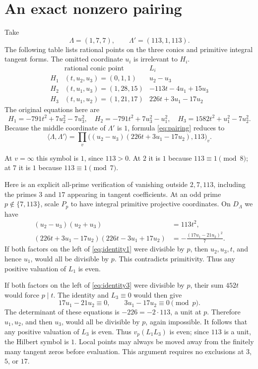 \documentclass[11pt]{article}
\begin{document}
\section{An exact nonzero pairing}
Take
\[
 \Lambda=(1,7,7),\qquad \Lambda'=(113,1,113).
\]
The following table lists rational points on the three conics and primitive integral tangent forms. The omitted coordinate $u_i$ is irrelevant to $H_i$.
\[
\begin{array}{c|c|l}
 &\text{rational conic point}&L_i\\\hline
 H_1&(t,u_2,u_3)=(0,1,1)&u_2-u_3\\
 H_2&(t,u_1,u_3)=(1,28,15)&-113t-4u_1+15u_3\\
 H_3&(t,u_1,u_2)=(1,21,17)&226t+3u_1-17u_2
\end{array}
\]
The original equations here are
\[
 H_1=-791t^2+7u_2^2-7u_3^2,
 \quad H_2=-791t^2+7u_3^2-u_1^2,
 \quad H_3=1582t^2+u_1^2-7u_2^2.
\]
Because the middle coordinate of $\Lambda'$ is $1$, formula \eqref{eq:pairing} reduces to
\begin{equation}\label{eq:two}
 \langle\Lambda,\Lambda'\rangle
 =\prod_v\bigl((u_2-u_3)(226t+3u_1-17u_2),113\bigr)_v.
\end{equation}

At $v=\infty$ this symbol is $1$, since $113>0$. At $2$ it is $1$ because $113\equiv1\pmod8$; at $7$ it is $1$ because $113\equiv1\pmod7$.

Here is an explicit all-prime verification of vanishing outside $2,7,113$, including the primes $3$ and $17$ appearing in tangent coefficients. At an odd prime $p\notin\{7,113\}$, scale $P_p$ to have integral primitive projective coordinates. On $D_\Lambda$ we have
\begin{align}
 (u_2-u_3)(u_2+u_3)&=113t^2,\label{eq:identity1}\\
 (226t+3u_1-17u_2)(226t-3u_1+17u_2)
 &=-\frac{(17u_1-21u_2)^2}{7}.\label{eq:identity3}
\end{align}
If both factors on the left of \eqref{eq:identity1} were divisible by $p$, then $u_2,u_3,t$, and hence $u_1$, would all be divisible by $p$. This contradicts primitivity. Thus any positive valuation of $L_1$ is even.

If both factors on the left of \eqref{eq:identity3} were divisible by $p$, their sum $452t$ would force $p\mid t$. The identity and $L_3\equiv0$ would then give
\[
 17u_1-21u_2\equiv0,\qquad3u_1-17u_2\equiv0\pmod p.
\]
The determinant of these equations is $-226=-2\cdot113$, a unit at $p$. Therefore $u_1,u_2$, and then $u_3$, would all be divisible by $p$, again impossible. It follows that any positive valuation of $L_3$ is even. Thus $v_p(L_1L_3)$ is even; since $113$ is a unit, the Hilbert symbol is $1$. Local points may always be moved away from the finitely many tangent zeros before evaluation. This argument requires no exclusions at $3$, $5$, or $17$.
\end{document}
